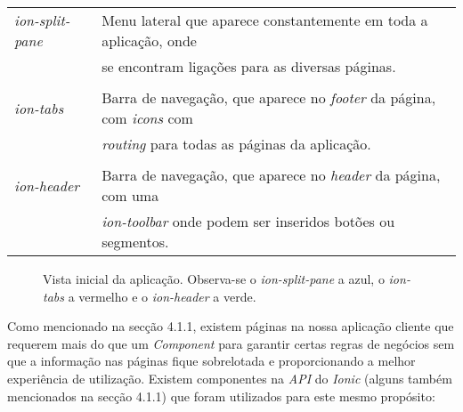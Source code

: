 \begin{tabular}{ll}
	\textit{ion-split-pane} & Menu lateral que aparece constantemente em toda a aplicação, onde \\
	&se encontram ligações para as diversas páginas.\\
	\\
	\textit{ion-tabs} & Barra de navegação, que aparece no \textit{footer} da página, com \textit{icons} com \\ &\textit{routing} para todas as páginas da aplicação. \\
	\\
	\textit{ion-header} & Barra de navegação, que aparece no \textit{header} da página, com uma \\
	&\textit{ion-toolbar} onde podem ser inseridos botões ou segmentos.\\
\end{tabular}

\begin{figure}[h]
	\begin{center}
	\end{center}
	\caption{Vista inicial da aplicação. Observa-se o \textit{ion-split-pane} a azul, o \textit{ion-tabs} a vermelho e o \textit{ion-header} a verde.}\label{fig:maincomponent}
\end{figure}

Como mencionado na secção 4.1.1, existem páginas na nossa aplicação cliente que requerem mais do que um \textit{Component} para garantir certas regras de negócios sem que a informação nas páginas fique sobrelotada e proporcionando a melhor experiência de utilização. Existem componentes na \textit{API} do \textit{Ionic} (alguns também mencionados na secção 4.1.1) que foram utilizados para este mesmo propósito:\\

